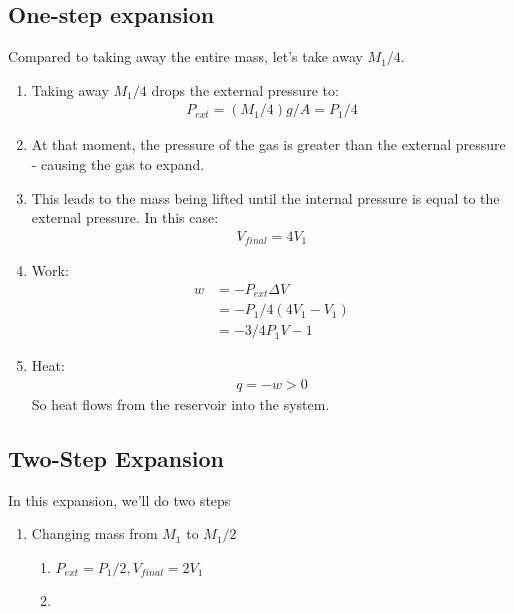 \documentclass{article}  %
\begin{document}
\subsection*{One-step expansion}
Compared to taking away the entire mass, let's take away $M_1/4$.
\begin{enumerate}
    \item Taking away $M_1/4$ drops the external pressure to:
        \begin{equation*}
            \begin{aligned}
                P_{ext} = (M_1/4)g/A = P_1/4
            \end{aligned}
        \end{equation*}
    \item At that moment, the pressure of the gas is greater than the external pressure - causing the gas to expand.
    \item This leads to the mass being lifted until the internal pressure is equal to the external pressure. In this case:
        \begin{equation*}
            \begin{aligned}
                V_{final} = 4V_1
            \end{aligned}
        \end{equation*}
    \item Work:
        \begin{equation*}
            \begin{aligned}
                w &= -P_{ext} \Delta V \\
                    &= -P_1/4(4V_1-V_1) \\
                    &= -3/4P_1 V-1
            \end{aligned}
        \end{equation*}
    \item Heat: 
        \begin{equation*}
            \begin{aligned}
                q = -w >0
            \end{aligned}
        \end{equation*}
        So heat flows from the reservoir into the system.
\end{enumerate}

\subsection*{Two-Step Expansion} %
In this expansion, we'll do two steps
\begin{enumerate}
    \item Changing mass from $M_1$ to $M_1/2$
        \begin{enumerate}
            \item $P_{ext} = P_1/2, V_{final}=2V_1$
            \item  
        \end{enumerate}
\end{enumerate}
\end{document}

